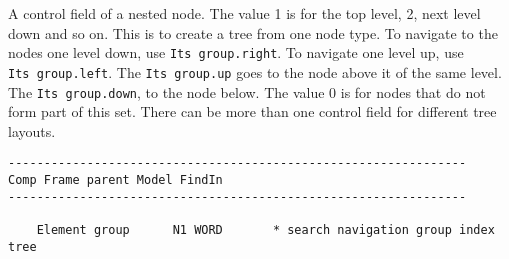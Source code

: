A control field of a nested node. The value 1 is for the top level, 2,
next level down and so on. This is to create a tree from one node type.
To navigate to the nodes one level down, use \texttt{Its\ group.right}.
To navigate one level up, use \texttt{Its\ group.left}. The
\texttt{Its\ group.up} goes to the node above it of the same level. The
\texttt{Its\ group.down}, to the node below. The value 0 is for nodes
that do not form part of this set. There can be more than one control
field for different tree layouts.

\begin{verbatim}
----------------------------------------------------------------
Comp Frame parent Model FindIn
----------------------------------------------------------------

    Element group      N1 WORD       * search navigation group index tree
\end{verbatim}
